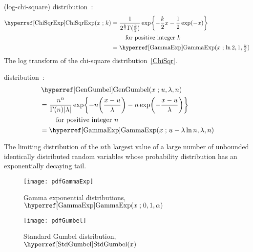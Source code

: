  (log-chi-square) distribution~\cite{Lee2012}:
\begin{align}
\label{ChiSqrExp}
\opr{ChiSqrExp}(x\given k) 
 &= \notag
\frac{1}{2^{\frac{k}{2}} \Gamma(\frac{k}{2})}  \exp\Left\{- \frac{k}{2} x - \frac{1}{2} \exp(-x)  \Right\} \checked
\\ & \qquad \text{ for positive integer } k
\\
&= \opr{GammaExp}(x\given \ln 2, 1 ,\tfrac{k}{2}) \checked
\notag
\end{align}
The log transform of the chi-square distribution~\eqref{ChiSqr}.


 distribution~\cite{Gumbel1958,Johnson1995}: 
\begin{align}
\label{GenGumbel}
&\opr{GenGumbel}(x\given u,{\lambda},n) 
\\ \notag  &= \notag
\frac{n^n}{\Gamma(n) |{\lambda}|}  \exp\Left\{ - n \Left(\frac{x-u}{{\lambda}}\Right) - n \exp\Left(- \frac{x-u}{{\lambda}}\Right)  \Right\} \checked
\\ & \qquad \text{ for positive integer } n
\notag
\\
&= \opr{GammaExp}(x\given u-{\lambda} \ln n,{\lambda},n) \checked
\notag
\end{align}

The limiting distribution of the $n$th largest value of a large number of unbounded identically distributed random variables whose probability distribution has an exponentially decaying tail.


\begin{figure}[t]
\begin{center}
\texttt{[image: pdfGammaExp]}   
\end{center}
\caption[Gamma exponential distributions]{Gamma exponential distributions, $\opr{GammaExp}(x\given 0,1,\alpha)$} 
\end{figure}


\begin{figure}[t]
\begin{center}
\texttt{[image: pdfGumbel]}  
\end{center}
\caption[Gumbel distribution]{Standard Gumbel distribution, $\opr{StdGumbel}(x)$} 
\end{figure}



